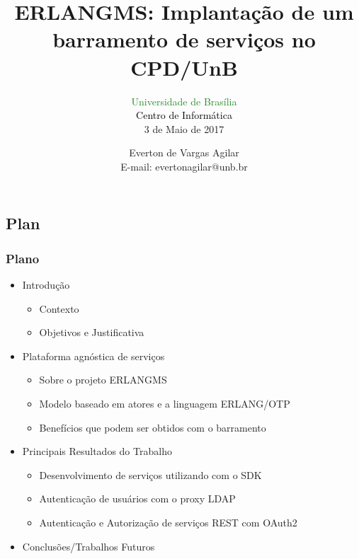 \documentclass{beamer}
\title{ERLANGMS: Implantação de um barramento de serviços no CPD/UnB}
\subtitle{ \textcolor{forestgreen}{Universidade de Brasília} \\
			\textcolor{black}{Centro de Informática} \\
			3 de Maio de 2017
}
\author{Everton de Vargas Agilar \\
		E-mail: evertonagilar@unb.br
}
\begin{document}
\begin{frame}
  \titlepage
\end{frame}








\subsection{Plan}

\begin{frame}
  \frametitle{Plano}

    \begin{itemize}

	    \item<1-> Introdução
		    \begin{itemize}
		  	  \item<1-> Contexto 
		    	  \item<1-> Objetivos e Justificativa
		     \end{itemize}

		 \item<1-> Plataforma agnóstica de serviços
		    \begin{itemize}
				\item<1-> Sobre o projeto ERLANGMS
				\item<1-> Modelo baseado em atores e a linguagem ERLANG/OTP
				\item<1-> Benefícios que podem ser obtidos com o barramento
		     \end{itemize}

  	  	 \item<1-> Principais Resultados do Trabalho
		    \begin{itemize}
				\item<1-> Desenvolvimento de serviços utilizando com o SDK
				\item<1-> Autenticação de usuários com o proxy LDAP
				\item<1-> Autenticação e Autorização de serviços REST com OAuth2
  		     \end{itemize}
  	  
	   	  \item<1-> Conclusões/Trabalhos Futuros
	   	  
    \end{itemize}

\end{frame}
\end{document}
